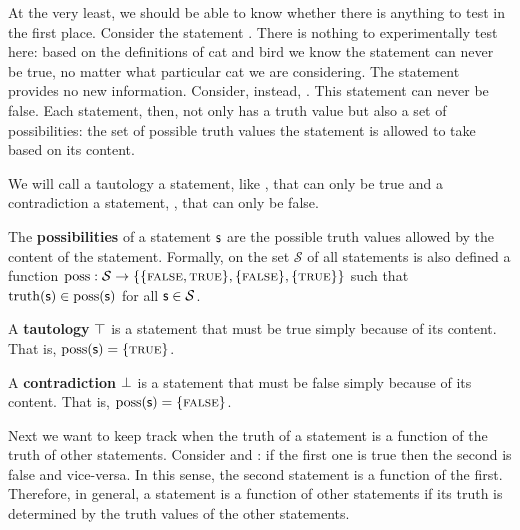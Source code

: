 \documentclass[11pt,letterpaper,fleqn]{memoir} %
\begin{document}
At the very least, we should be able to know whether there is anything to test in the first place. Consider the statement . There is nothing to experimentally test here: based on the definitions of cat and bird we know the statement can never be true, no matter what particular cat we are considering. The statement provides no new information. Consider, instead, . This statement can never be false. Each statement, then, not only has a truth value but also a set of possibilities: the set of possible truth values the statement is allowed to take based on its content.

We will call a tautology a statement, like , that can only be true and a contradiction a statement, , that can only be false.

\begin{mathSection}
	
	\begin{axiom}\label{def_possibilities}
		The \textbf{possibilities} of a statement $\mathsf{s}$ are the possible truth values allowed by the content of the statement. Formally, on the set $\mathcal{S}$ of all statements is also defined a function $\operatorname{poss}: \mathcal{S} \to \{\{\textsc{false}, \textsc{true}\},\{\textsc{false}\},\{\textsc{true}\}\}$ such that $\operatorname{truth}(\mathsf{s}) \in \operatorname{poss}(\mathsf{s})$ for all $\mathsf{s} \in \mathcal{S}$.
	\end{axiom}
	
	\begin{defn}
		A \textbf{tautology} $\top$ is a statement that must be true simply because of its content. That is, $\operatorname{poss}(\mathsf{s}) = \{\textsc{true}\}$.
	\end{defn}
	
	\begin{defn}
		A \textbf{contradiction} $\bot$ is a statement that must be false simply because of its content. That is, $\operatorname{poss}(\mathsf{s}) = \{\textsc{false}\}$.
	\end{defn}
	
\end{mathSection}

Next we want to keep track when the truth of a statement is a function of the truth of other statements. Consider  and : if the first one is true then the second is false and vice-versa. In this sense, the second statement is a function of the first. Therefore, in general, a statement is a function of other statements if its truth is determined by the truth values of the other statements.
\end{document}
